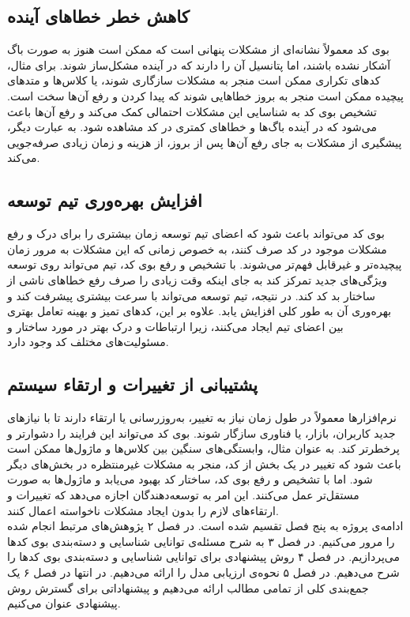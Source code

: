 \subsection{کاهش خطر خطاهای آینده}
بوی کد معمولاً نشانه‌ای از مشکلات پنهانی است که ممکن است هنوز به صورت باگ آشکار نشده باشند، اما پتانسیل آن را دارند که در آینده مشکل‌ساز شوند. برای مثال، کدهای تکراری ممکن است منجر به مشکلات سازگاری شوند، یا کلاس‌ها و متدهای پیچیده ممکن است منجر به بروز خطاهایی شوند که پیدا کردن و رفع آن‌ها سخت است. تشخیص بوی کد به شناسایی این مشکلات احتمالی کمک می‌کند و رفع آن‌ها باعث می‌شود که در آینده باگ‌ها و خطاهای کمتری در کد مشاهده شود. به عبارت دیگر، پیشگیری از مشکلات به جای رفع آن‌ها پس از بروز، از هزینه و زمان زیادی صرفه‌جویی می‌کند.
\subsection{افزایش بهره‌وری تیم توسعه}
بوی کد می‌تواند باعث شود که اعضای تیم توسعه زمان بیشتری را برای درک و رفع مشکلات موجود در کد صرف کنند، به خصوص زمانی که این مشکلات به مرور زمان پیچیده‌تر و غیرقابل فهم‌تر می‌شوند. با تشخیص و رفع بوی کد، تیم می‌تواند روی توسعه ویژگی‌های جدید تمرکز کند به جای اینکه وقت زیادی را صرف رفع خطاهای ناشی از ساختار بد کد کند. در نتیجه، تیم توسعه می‌تواند با سرعت بیشتری پیشرفت کند و بهره‌وری آن به طور کلی افزایش یابد. علاوه بر این، کدهای تمیز و بهینه تعامل بهتری بین اعضای تیم ایجاد می‌کنند، زیرا ارتباطات و درک بهتر در مورد ساختار و مسئولیت‌های مختلف کد وجود دارد.
\subsection {پشتیبانی از تغییرات و ارتقاء سیستم}
نرم‌افزارها معمولاً در طول زمان نیاز به تغییر، به‌روزرسانی یا ارتقاء دارند تا با نیازهای جدید کاربران، بازار، یا فناوری سازگار شوند. بوی کد می‌تواند این فرایند را دشوارتر و پرخطرتر کند. به عنوان مثال، وابستگی‌های سنگین بین کلاس‌ها و ماژول‌ها ممکن است باعث شود که تغییر در یک بخش از کد، منجر به مشکلات غیرمنتظره در بخش‌های دیگر شود. اما با تشخیص و رفع بوی کد، ساختار کد بهبود می‌یابد و ماژول‌ها به صورت مستقل‌تر عمل می‌کنند. این امر به توسعه‌دهندگان اجازه می‌دهد که تغییرات و ارتقاءهای لازم را بدون ایجاد مشکلات ناخواسته اعمال کنند.
\\
ادامه‌ی پروژه به پنج فصل تقسیم شده است. در فصل ۲ پژوهش‌های مرتبط انجام شده را مرور می‌کنیم. در فصل ۳ به شرح مسئله‌ی توانایی شناسایی و دسته‌بندی بوی کدها می‌پردازیم. در فصل ۴ روش پیشنهادی برای توانایی شناسایی و دسته‌بندی بوی کدها را شرح می‌دهیم. در فصل ۵ نحوه‌ی ارزیابی مدل را ارائه می‌دهیم. در انتها در فصل ۶ یک جمع‌بندی کلی از تمامی مطالب ارائه می‌دهیم و پیشنهاداتی برای گسترش روش پیشنهادی عنوان می‌کنیم.

\clearpage

